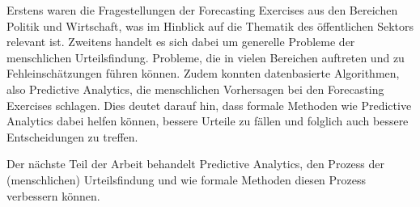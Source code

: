Erstens waren die Fragestellungen der Forecasting Exercises aus den
Bereichen Politik und Wirtschaft, was im Hinblick auf die Thematik des öffentlichen Sektors relevant ist. Zweitens handelt
es sich dabei um generelle Probleme der menschlichen Urteilsfindung.
Probleme, die in vielen Bereichen auftreten und zu Fehleinschätzungen führen
können. Zudem konnten datenbasierte Algorithmen, also
Predictive Analytics, die menschlichen Vorhersagen bei den 
Forecasting Exercises schlagen. Dies deutet darauf hin, dass formale
Methoden wie Predictive Analytics dabei helfen können, bessere Urteile 
zu fällen und folglich auch bessere Entscheidungen zu treffen.

Der nächste Teil der Arbeit behandelt Predictive Analytics,
den Prozess der (menschlichen) Urteilsfindung und wie formale Methoden diesen
Prozess verbessern können.
